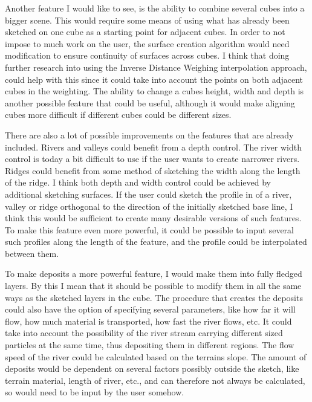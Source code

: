 \documentclass[a4paper,12pt]{report}
\begin{document}
Another feature I would like to see, is the ability to combine several cubes into a bigger scene. This would require some means of using what has already been sketched on one cube as a starting point for adjacent cubes. In order to not impose to much work on the user, the surface creation algorithm would need modification to ensure continuity of surfaces across cubes. I think that doing further research into using the Inverse Distance Weighing interpolation approach, could help with this since it could take into account the points on both adjacent cubes in the weighting. The ability to change a cubes height, width and depth is another possible feature that could be useful, although it would make aligning cubes more difficult if different cubes could be different sizes.


There are also a lot of possible improvements on the features that are already included. Rivers and valleys could benefit from a depth control. The river width control is today a bit difficult to use if the user wants to create narrower rivers. Ridges could benefit from some method of sketching the width along the length of the ridge. I think both depth and width control could be achieved by additional sketching surfaces. If the user could sketch the profile in of a river, valley or ridge orthogonal to the direction of the initially sketched base line, I think this would be sufficient to create many desirable versions of such features. To make this feature even more powerful, it could be possible to input several such profiles along the length of the feature, and the profile could be interpolated between them.

To make deposits a more powerful feature, I would make them into fully fledged layers. By this I mean that it should be possible to modify them in all the same ways as the sketched layers in the cube. The procedure that creates the deposits could also have the option of specifying several parameters, like how far it will flow, how much material is transported, how fast the river flows, etc. It could take into account the possibility of the river stream carrying different sized particles at the same time, thus depositing them in different regions. The flow speed of the river could be calculated based on the terrains slope. The amount of deposits would be dependent on several factors possibly outside the sketch, like terrain material, length of river, etc., and can therefore not always be calculated, so would need to be input by the user somehow.
\end{document}

